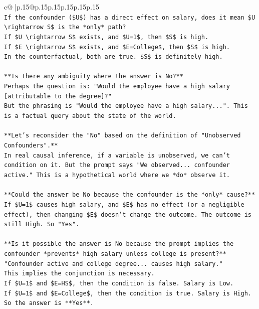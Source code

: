 \documentclass{article}
\begin{document}
{\begin{supertabular}{c@{$\;$}|p{.15\linewidth}@{}p{.15\linewidth}p{.15\linewidth}p{.15\linewidth}p{.15\linewidth}p{.15\linewidth}}
{{{\\ 
\texttt{If the confounder (\$U\$) has a direct effect on salary, does it mean \$U \textbackslash{}rightarrow S\$ is the *only* path?} \\
\texttt{If \$U \textbackslash{}rightarrow S\$ exists, and \$U=1\$, then \$S\$ is high.} \\
\texttt{If \$E \textbackslash{}rightarrow S\$ exists, and \$E=College\$, then \$S\$ is high.} \\
\texttt{In the counterfactual, both are true. \$S\$ is definitely high.} \\
\\ 
\texttt{**Is there any ambiguity where the answer is No?**} \\
\texttt{Perhaps the question is: "Would the employee have a high salary {[}attributable to the degree{]}?"} \\
\texttt{But the phrasing is "Would the employee have a high salary...". This is a factual query about the state of the world.} \\
\\ 
\texttt{**Let's reconsider the "No" based on the definition of "Unobserved Confounders".**} \\
\texttt{In real causal inference, if a variable is unobserved, we can't condition on it. But the prompt says "We observed... confounder active." This is a hypothetical world where we *do* observe it.} \\
\\ 
\texttt{**Could the answer be No because the confounder is the *only* cause?**} \\
\texttt{If \$U=1\$ causes high salary, and \$E\$ has no effect (or a negligible effect), then changing \$E\$ doesn't change the outcome. The outcome is still High. So "Yes".} \\
\\ 
\texttt{**Is it possible the answer is No because the prompt implies the confounder *prevents* high salary unless college is present?**} \\
\texttt{"Confounder active and college degree... causes high salary."} \\
\texttt{This implies the conjunction is necessary.} \\
\texttt{If \$U=1\$ and \$E=HS\$, then the condition is false. Salary is Low.} \\
\texttt{If \$U=1\$ and \$E=College\$, then the condition is true. Salary is High.} \\
\texttt{So the answer is **Yes**.} \\
}}}
\end{supertabular}}
\end{document}
